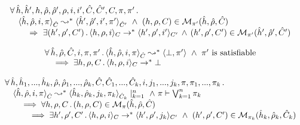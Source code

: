 \begin{theorem}\label{teo:soundness:jsil:symb:exe}
$$
\begin{array}{l}
\forall \, \sheap, \sheap', \heap, \sstore, \sstore', \store, i, i', \sctx, \sctx', \ctx, \pc, \pc' \, . \,  \\  
\quad \symbtranstrans{\sheap, \sstore, i, \pc}{\sheap', \sstore', i', \pc'}[\sctx][\sctx'] 
   \ \wedge \ 
      (\heap, \store, \ctx) \in \smodels{\sheap, \sstore, \sctx}{\pc'} \\ \quad \quad
      	 \ \Rightarrow \ \exists (\heap', \store', \ctx') \, . \, 
	 	 \semtranstrans{\heap, \store, i}{\heap', \store', i'}[\ctx][\ctx']
		\, \wedge \, 
		(\heap', \store', \ctx') \in \smodels{\sheap', \sstore', \sctx'}{\pc'}  
\end{array}
$$
\end{theorem}

\begin{corollary}\label{bug:finding}
$$
\begin{array}{l}
\forall \, \sheap, \sstore, \sctx, i, \pc, \pc' \, . \,  
 \symbtranstranserr{\sheap, \sstore, i, \pc}{\sctx}{\pc'}  \ \wedge \  \pc' \text{ is satisfiable} \\ 
   \quad \implies 
     \exists \heap, \store, \ctx \, . \, \semtranstranserr{\heap, \store, i}[\ctx]
\end{array}
$$
\end{corollary}

\begin{corollary}[Verification]\label{corollary:verification}
$$
\begin{array}{l}
\forall \, \sheap, \sheap_1, ..., \sheap_k, \sstore, \sstore_1, ..., \sstore_k, \sctx, \sctx_1, ..., \sctx_k, i, j_1, ..., j_k, \pc, \pc_1, ..., \pc_k \, . \,  \\
  \quad \symbtranstrans{\sheap, \sstore, i, \pc}{\sheap_k, \sstore_k, j_k, \pc_k}[\sctx][\sctx_k]\mid_{k = 1}^n
      \ \wedge \ \pc \vdash \bigvee_{k=1}^n \pc_k \\ 
      \quad \quad \implies 
         \forall \heap, \store, \ctx \, . \, (\heap, \store, \ctx) \in \smodels{\sheap, \sstore, \sctx}{\pc} \\
          \quad \qquad \implies \exists \heap', \store', \ctx' \, . \, 
                  \semtranstrans{\heap, \store, i}{\heap', \store', j_k}[\ctx][\ctx'] \ \wedge \ 
                  (\heap', \store', \ctx') \in \smodels{\sheap_k, \sstore_k, \sctx_k}{\pc_k}
\end{array}   
$$ 
\end{corollary}



